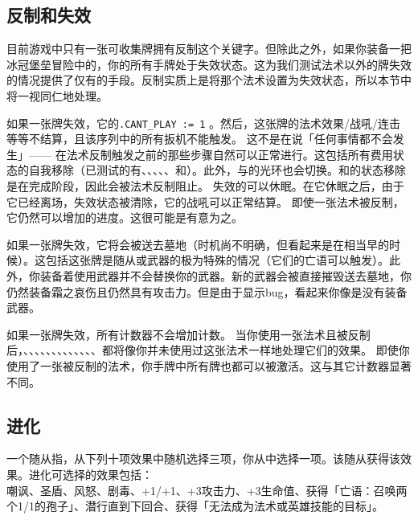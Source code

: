 \subsection{反制和失效}
\label{counter}

目前游戏中只有一张可收集牌拥有反制这个关键字。但除此之外，如果你装备一把冰冠堡垒冒险中的，你的所有手牌处于失效状态。这为我们测试法术以外的牌失效的情况提供了仅有的手段。反制实质上是将那个法术设置为失效状态，所以本节中将一视同仁地处理。

如果一张牌失效，它的\texttt{.CANT\_PLAY := 1} 。然后，这张牌的法术效果/战吼/连击等等不结算，且该序列中的所有扳机不能触发。
\notice 这不是在说「任何事情都不会发生」—— 在法术反制触发之前的那些步骤自然可以正常进行。这包括所有费用状态的自我移除（已测试的有、、、、、和）。此外，与的光环也会切换。和的状态移除是在完成阶段，因此会被法术反制阻止。
\exception 失效的可以休眠。在它休眠之后，由于它已经离场，失效状态被清除，它的战吼可以正常结算。
\exception {} 即使一张法术被反制，它仍然可以增加的进度。这很可能是有意为之。

如果一张牌失效，它将会被送去墓地（时机尚不明确，但看起来是在相当早的时候）。这包括这张牌是随从或武器的极为特殊的情况（它们的亡语可以触发）。此外，你装备着使用武器并不会替换你的武器。新的武器会被直接摧毁送去墓地，你仍然装备霜之哀伤且仍然具有攻击力。但是由于显示bug，看起来你像是没有装备武器。

如果一张牌失效，所有计数器不会增加计数。
\example 当你使用一张法术且被反制后，、、、、、、、、、、、、、都将像你并未使用过这张法术一样地处理它们的效果。
\exception 即使你使用了一张被反制的法术，你手牌中所有牌也都可以被激活。这与其它计数器显著不同。

\subsection{进化}
\label{adapt}

一个随从指，从下列十项效果中随机选择三项，你从中选择一项。该随从获得该效果。进化可选择的效果包括：\\
嘲讽、圣盾、风怒、剧毒、+1/+1、+3攻击力、+3生命值、获得「亡语：召唤两个1/1的孢子」、潜行直到下回合、获得「无法成为法术或英雄技能的目标」。

